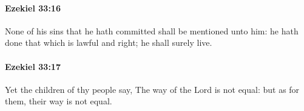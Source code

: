 		\paragraph{Ezekiel 33:16} %
			\label{EZEKIEL-33-16}

			None of his sins that he hath committed shall be mentioned unto him: he hath done that which is lawful and right; he shall surely live.


		\paragraph{Ezekiel 33:17} %
			\label{EZEKIEL-33-17}

			Yet the children of thy people say, The way of the Lord is not equal: but as for them, their way is not equal.


